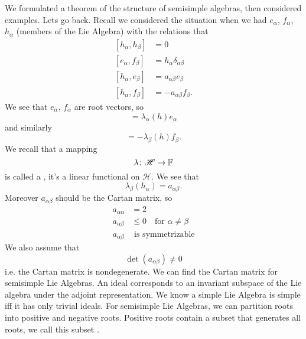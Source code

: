 We formulated a theorem of the structure of semisimple algebras,
then considered examples. Lets go back. Recall we considered the
situation when we had $e_{\alpha}$, $f_{\alpha}$, $h_{\alpha}$
(members of the Lie Algebra) with the relations that
\begin{subequations}
\begin{align}
[h_{\alpha}, h_{\beta}] &= 0\\
[e_{\alpha}, f_{\beta}] &= h_{\alpha}\delta_{\alpha\beta}\\
[h_{\alpha}, e_{\beta}] &= a_{\alpha\beta}e_{\beta}\\
[h_{\alpha}, f_{\beta}] &=-a_{\alpha\beta}f_{\beta}.
\end{align}
\end{subequations}
We see that $e_{\alpha}$, $f_{\alpha}$ are root vectors, so
\begin{equation}
[h, e_{\alpha}] = \lambda_{\alpha}(h)e_{\alpha}
\end{equation}
and similarly
\begin{equation}
[h, f_{\beta}] = -\lambda_{\beta}(h)f_{\beta}.
\end{equation}
We recall that a mapping
\begin{equation}
\lambda\colon\mathscr{H}\to\Bbb{F}
\end{equation}
is called a , it's a linear functional on
$\mathscr{H}$. We see that
\begin{equation}
\lambda_{\beta}(h_{\alpha})=a_{\alpha\beta}.
\end{equation}
Moreover $a_{\alpha\beta}$ should be the Cartan matrix, so 
\begin{subequations}
\begin{align}
a_{\alpha\alpha}&=2\\
a_{\alpha\beta}&\leq0\quad\mbox{for }\alpha\not=\beta\\
a_{\alpha\beta}&\mbox{ is symmetrizable}
\end{align}
\end{subequations}
We also assume that
\begin{equation}
\det(a_{\alpha\beta})\not=0
\end{equation}
i.e. the Cartan matrix is nondegenerate. We can find the Cartan
matrix for semisimple Lie Algebras. An ideal corresponds to an
invariant subspace of the Lie algebra under the adjoint
representation. We know a simple Lie Algebra is simple iff it has
only trivial ideals. For semisimple Lie Algebras, we can
partition roots into positive and negative roots. Positive roots
contain a subset that generates all roots, we call this subset
.

